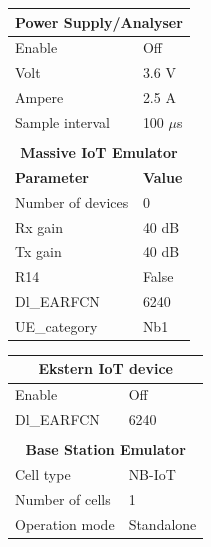 \begin{table}[H]
\captionsetup{belowskip=0em}
\noindent
\centering
\begin{minipage}[t]{0.48\textwidth}
\begin{tabular}{|p{4cm}|p{2cm}|}
\hline
\multicolumn{2}{|c|}{\textbf{Power Supply/Analyser}}                         \\ \hline
Enable             & Off            \\ \hline
Volt               & 3.6 V          \\ \hline
Ampere             & 2.5 A          \\ \hline
Sample interval	   & 100 $\mu$s		\\ \hline
\multicolumn{2}{c}{}\\ \hline
\multicolumn{2}{|c|}{\textbf{Massive IoT Emulator}}                          \\ \hline
\textbf{Parameter} & \textbf{Value} \\ \hline
Number of devices  & 0              \\ \hline
Rx gain            & 40 dB          \\ \hline
Tx gain            & 40 dB          \\ \hline
R14                & False          \\ \hline
Dl\_EARFCN         & 6240           \\ \hline
UE\_category       & Nb1            \\ \hline
\end{tabular}
\end{minipage}%
\hfill
\begin{minipage}[t]{0.48\textwidth}
\begin{tabular}{|p{4cm}|p{2cm}|}
\hline
\multicolumn{2}{|c|}{\textbf{Ekstern IoT device}}                            \\ \hline
Enable             & Off            \\ \hline
Dl\_EARFCN         & 6240           \\ \hline
\multicolumn{2}{c}{}\\ \hline
\multicolumn{2}{|c|}{\textbf{Base Station Emulator}}                         \\ \hline
Cell type          & NB-IoT         \\ \hline
Number of cells    & 1              \\ \hline
Operation mode     & Standalone     \\ \hline

\end{tabular}
\end{minipage}
\end{table}
